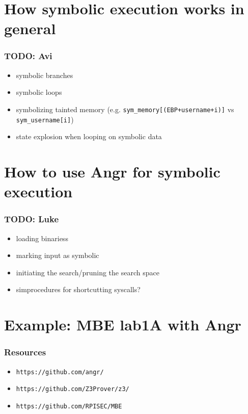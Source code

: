 \documentclass[aspectratio=169]{beamer}
\begin{document}
\section{How symbolic execution works in general}
\begin{frame}[fragile]
\frametitle{TODO: Avi}
\begin{itemize}
\item symbolic branches
\item symbolic loops
\item symbolizing tainted memory (e.g. \verb|sym_memory[(EBP+username+i)]| vs \verb|sym_username[i]|)
\item state explosion when looping on symbolic data
\end{itemize}
\end{frame}

\section{How to use Angr for symbolic execution}
\begin{frame}[fragile]
\frametitle{TODO: Luke}
\begin{itemize}
\item loading binariess
\item marking input as symbolic
\item initiating the search/pruning the search space
\item simprocedures for shortcutting syscalls?
\end{itemize}
\end{frame}

\section{Example: MBE lab1A with Angr}
\begin{frame}[fragile]
\frametitle{Resources}
\begin{itemize}
\item \verb|https://github.com/angr/|
\item \verb|https://github.com/Z3Prover/z3/|
\item \verb|https://github.com/RPISEC/MBE|
\end{itemize}
\end{frame}
\end{document}

